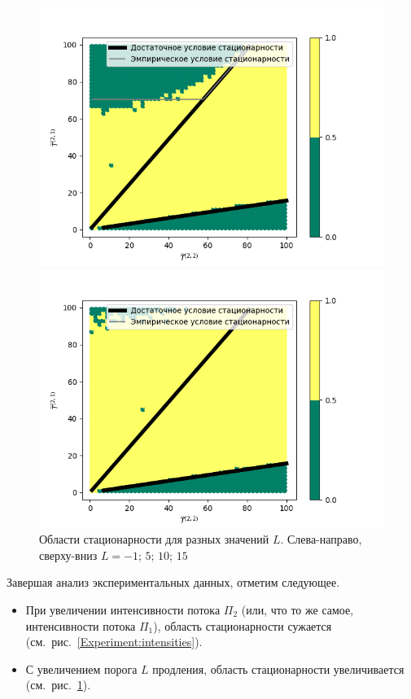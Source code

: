 \begin{figure}
\begin{multicols}{2}
    \end{multicols}
\begin{multicols}{2}
    \includegraphics[width=1.15\linewidth]{Pictures/0_1_thres_10_fact.png}\par
    \includegraphics[width=1.15\linewidth]{Pictures/0_1_thres_15_fact.png}\par
\end{multicols}
\caption{Области стационарности для разных значений $L$. Слева-направо, сверху-вниз $L=-1$; $5$; $10$; $15$}
\label{different:thres}
\end{figure}
Завершая анализ экспериментальных данных, отметим следующее.
\begin{itemize}
    \item При увеличении интенсивности потока $\Pi_2$ (или, что то же самое, интенсивности потока $\Pi_1$), область стационарности сужается (см.~рис.~\ref{Experiment:intensities}).
    \item С увеличением порога $L$ продления, область стационарности увеличивается (см.~рис.~\ref{different:thres}).
\end{itemize}

